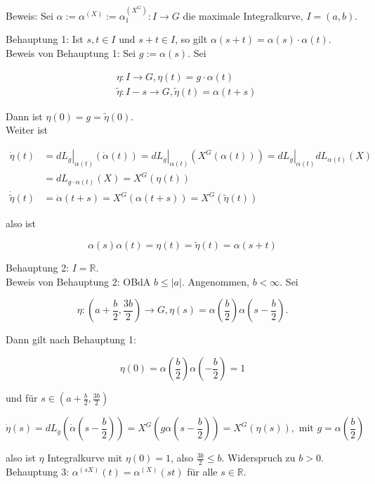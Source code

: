 \documentclass[10pt, letterpaper]{article}
\begin{document}
Beweis: Sei $\alpha:=\alpha^{(X)}:=\alpha_{1}^{\left(X^{G}\right)}: I \rightarrow G$ die maximale Integralkurve, $I=(a, b)$.

Behauptung 1: Ist $s, t \in I$ und $s+t \in I$, so gilt $\alpha(s+t)=\alpha(s) \cdot \alpha(t)$.\\
Beweis von Behauptung 1: Sei $g:=\alpha(s)$. Sei

$$
\begin{aligned}
& \eta: I \rightarrow G, \eta(t)=g \cdot \alpha(t) \\
& \tilde{\eta}: I-s \rightarrow G, \tilde{\eta}(t)=\alpha(t+s)
\end{aligned}
$$

Dann ist $\eta(0)=g=\tilde{\eta}(0)$.\\
Weiter ist

$$
\begin{aligned}
\dot{\eta}(t) & =\left.d L_{g}\right|_{\alpha(t)}(\dot{\alpha}(t))=\left.d L_{g}\right|_{\alpha(t)}\left(X^{G}(\alpha(t))\right)=\left.d L_{g}\right|_{\alpha(t)} d L_{\alpha(t)}(X) \\
& =d L_{g \cdot \alpha(t)}(X)=X^{G}(\eta(t)) \\
\dot{\tilde{\eta}}(t) & =\dot{\alpha}(t+s)=X^{G}(\alpha(t+s))=X^{G}(\tilde{\eta}(t))
\end{aligned}
$$

also ist

$$
\alpha(s) \alpha(t)=\eta(t)=\tilde{\eta}(t)=\alpha(s+t)
$$

Behauptung 2: $I=\mathbb{R}$.\\
Beweis von Behauptung 2: OBdA $b \leq|a|$. Angenommen, $b<\infty$. Sei

$$
\eta:\left(a+\frac{b}{2}, \frac{3 b}{2}\right) \rightarrow G, \eta(s)=\alpha\left(\frac{b}{2}\right) \alpha\left(s-\frac{b}{2}\right) .
$$

Dann gilt nach Behauptung 1:

$$
\eta(0)=\alpha\left(\frac{b}{2}\right) \alpha\left(-\frac{b}{2}\right)=1
$$

und für $s \in\left(a+\frac{b}{2}, \frac{3 b}{2}\right)$

$$
\dot{\eta}(s)=d L_{g}\left(\dot{\alpha}\left(s-\frac{b}{2}\right)\right)=X^{G}\left(g \alpha\left(s-\frac{b}{2}\right)\right)=X^{G}(\eta(s)), \text { mit } g=\alpha\left(\frac{b}{2}\right)
$$

also ist $\eta$ Integralkurve mit $\eta(0)=1$, also $\frac{3 b}{2} \leq b$. Widerspruch zu $b>0$.\\
Behauptung 3: $\alpha^{(s X)}(t)=\alpha^{(X)}(s t)$ für alle $s \in \mathbb{R}$.
\end{document}
